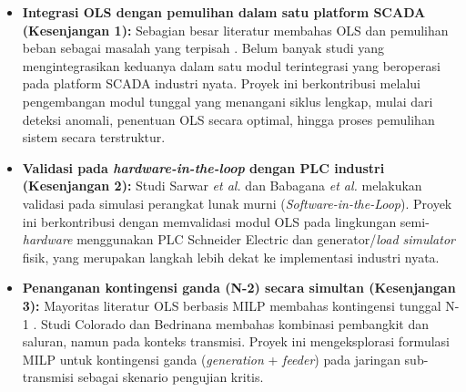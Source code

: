 \begin{itemize}
    \item[a.] \textbf{Integrasi OLS dengan pemulihan dalam satu platform SCADA (Kesenjangan 1):} Sebagian besar literatur membahas OLS dan pemulihan beban sebagai masalah yang terpisah \cite{Sarwar2020, Liao2019, Dou2023}. Belum banyak studi yang mengintegrasikan keduanya dalam satu modul terintegrasi yang beroperasi pada platform SCADA industri nyata. Proyek ini berkontribusi melalui pengembangan modul tunggal yang menangani siklus lengkap, mulai dari deteksi anomali, penentuan OLS secara optimal, hingga proses pemulihan sistem secara terstruktur.
    \item[b.] \textbf{Validasi pada \textit{hardware-in-the-loop} dengan PLC industri (Kesenjangan 2):} Studi Sarwar \textit{et al.} \cite{Sarwar2020, Sarwar2022} dan Babagana \textit{et al.} \cite{Babagana2025} melakukan validasi pada simulasi perangkat lunak murni (\textit{Software-in-the-Loop}). Proyek ini berkontribusi dengan memvalidasi modul OLS pada lingkungan semi-\textit{hardware} menggunakan PLC Schneider Electric dan generator/\textit{load simulator} fisik, yang merupakan langkah lebih dekat ke implementasi industri nyata.
    \item[c.] \textbf{Penanganan kontingensi ganda (N-2) secara simultan (Kesenjangan 3):} Mayoritas literatur OLS berbasis MILP membahas kontingensi tunggal N-1 \cite{Sarwar2020, Arenas2026}. Studi Colorado dan Bedrinana \cite{Colorado2018} membahas kombinasi pembangkit dan saluran, namun pada konteks transmisi. Proyek ini mengeksplorasi formulasi MILP untuk kontingensi ganda (\textit{generation} + \textit{feeder}) pada jaringan sub-transmisi sebagai skenario pengujian kritis.
\end{itemize}